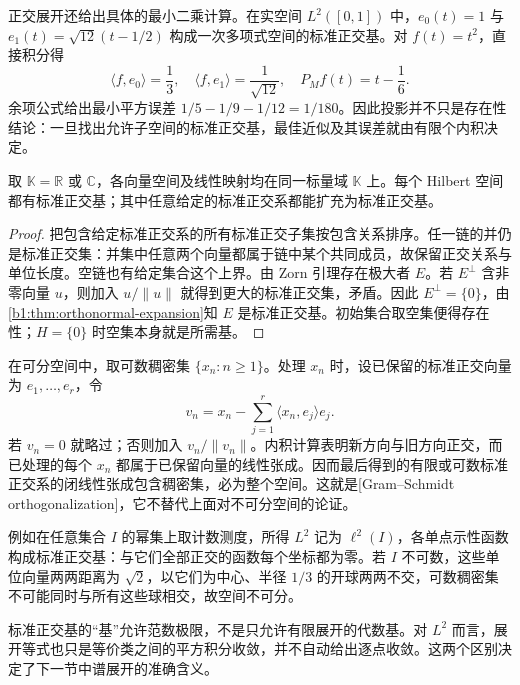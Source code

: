 \ProseParagraphBreak

正交展开还给出具体的最小二乘计算。在实空间 \(L^2([0,1])\) 中，\(e_0(t)=1\) 与 \(e_1(t)=\sqrt{12}(t-1/2)\) 构成一次多项式空间的标准正交基。对 \(f(t)=t^2\)，直接积分得
\[
\langle f,e_0\rangle=\dfrac13,
\quad
\langle f,e_1\rangle=\dfrac1{\sqrt{12}},
\quad
P_Mf(t)=t-\dfrac16.
\]
余项公式给出最小平方误差 \(1/5-1/9-1/12=1/180\)。因此投影并不只是存在性结论：一旦找出允许子空间的标准正交基，最佳近似及其误差就由有限个内积决定。

\begin{theorem}[标准正交基的存在]\label{b1:thm:orthonormal-basis-existence}
取 \(\mathbb K=\mathbb R\) 或 \(\mathbb C\)，各向量空间及线性映射均在同一标量域 \(\mathbb K\) 上。每个 Hilbert 空间都有标准正交基；其中任意给定的标准正交系都能扩充为标准正交基。
\end{theorem}
\begin{proof}
把包含给定标准正交系的所有标准正交子集按包含关系排序。任一链的并仍是标准正交集：并集中任意两个向量都属于链中某个共同成员，故保留正交关系与单位长度。空链也有给定集合这个上界。由 Zorn 引理存在极大者 \(E\)。若 \(E^\perp\) 含非零向量 \(u\)，则加入 \(u/\|u\|\) 就得到更大的标准正交集，矛盾。因此 \(E^\perp=\{0\}\)，由\cref{b1:thm:orthonormal-expansion}知 \(E\) 是标准正交基。初始集合取空集便得存在性；\(H=\{0\}\) 时空集本身就是所需基。
\end{proof}

在可分空间中，取可数稠密集 \(\{x_n:n\geq1\}\)。处理 \(x_n\) 时，设已保留的标准正交向量为 \(e_1,\ldots,e_r\)，令
\[
v_n=x_n-\sum_{j=1}^r\langle x_n,e_j\rangle e_j.
\]
若 \(v_n=0\) 就略过；否则加入 \(v_n/\|v_n\|\)。内积计算表明新方向与旧方向正交，而已处理的每个 \(x_n\) 都属于已保留向量的线性张成。因而最后得到的有限或可数标准正交系的闭线性张成包含稠密集，必为整个空间。这就是[Gram--Schmidt orthogonalization]，它不替代上面对不可分空间的论证。

\ProseParagraphBreak

例如在任意集合 \(I\) 的幂集上取计数测度，所得 \(L^2\) 记为 \(\ell^2(I)\)，各单点示性函数构成标准正交基：与它们全部正交的函数每个坐标都为零。若 \(I\) 不可数，这些单位向量两两距离为 \(\sqrt2\)，以它们为中心、半径 \(1/3\) 的开球两两不交，可数稠密集不可能同时与所有这些球相交，故空间不可分。

\ProseParagraphBreak

标准正交基的“基”允许范数极限，不是只允许有限展开的代数基。对 \(L^2\) 而言，展开等式也只是等价类之间的平方积分收敛，并不自动给出逐点收敛。这两个区别决定了下一节中谱展开的准确含义。
